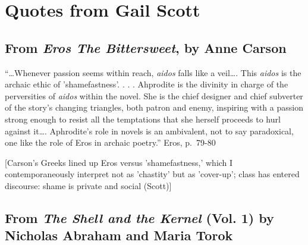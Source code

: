 \documentclass[
]{memoir}
\begin{document}
\hypertarget{quotes-from-gail-scott}{%
\section*{Quotes from Gail Scott}\label{quotes-from-gail-scott}}

\hypertarget{from-eros-the-bittersweet-by-anne-carson}{%
\subsection*{\texorpdfstring{From \emph{Eros The Bittersweet}, by Anne
Carson}{From Eros The Bittersweet, by Anne Carson}}\label{from-eros-the-bittersweet-by-anne-carson}}

``\ldots{}Whenever passion seems within reach, \emph{aidos} falls like a
veil\ldots{}. This \emph{aidos} is the archaic ethic of 'shamefastness'.
. . . Ahprodite is the divinity in charge of the perversities of
\emph{aidos} within the novel. She is the chief designer and chief
subverter of the story's changing triangles, both patron and enemy,
inspiring with a passion strong enough to resist all the temptations
that she herself proceeds to hurl against it\ldots{}. Aphrodite's role
in novels is an ambivalent, not to say paradoxical, one like the role of
Eros in archaic poetry.'' Eros, p.~79-80

{[}Carson's Greeks lined up Eros versus 'shamefastness,' which I
contemporaneously interpret not as 'chastity' but as 'cover-up'; class
has entered discourse: shame is private and social (Scott){]}

\hypertarget{from-the-shell-and-the-kernel-vol.-1-by-nicholas-abraham-and-maria-torok}{%
\subsection*{\texorpdfstring{From \emph{The Shell and the Kernel} (Vol.
1) by Nicholas Abraham and Maria
Torok}{From The Shell and the Kernel (Vol. 1) by Nicholas Abraham and Maria Torok}}\label{from-the-shell-and-the-kernel-vol.-1-by-nicholas-abraham-and-maria-torok}}
\end{document}
